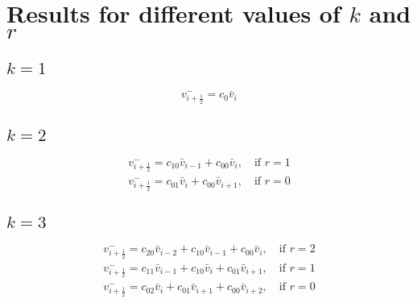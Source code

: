 \documentclass{article}
\begin{document}
\section*{Results for different values of $k$ and $r$}

\subsection*{$k=1$}
\begin{equation}
\begin{array}{l}
\displaystyle v_{i+\frac{1}{2}}^{-} = c_{0} \bar{v}_{i}
\end{array}
\end{equation}

\subsection*{$k=2$}
\begin{equation}
\begin{array}{l}
\displaystyle v_{i+\frac{1}{2}}^{-} = c_{10} \bar{v}_{i-1} + c_{00} \bar{v}_{i}, \quad \text{if } r = 1 \\
\displaystyle v_{i+\frac{1}{2}}^{-} = c_{01} \bar{v}_{i} + c_{00} \bar{v}_{i+1}, \quad \text{if } r = 0
\end{array}
\end{equation}

\subsection*{$k=3$}
\begin{equation}
\begin{array}{l}
\displaystyle v_{i+\frac{1}{2}}^{-} = c_{20} \bar{v}_{i-2} + c_{10} \bar{v}_{i-1} + c_{00} \bar{v}_{i}, \quad \text{if } r = 2 \\
\displaystyle v_{i+\frac{1}{2}}^{-} = c_{11} \bar{v}_{i-1} + c_{10} \bar{v}_{i} + c_{01} \bar{v}_{i+1}, \quad \text{if } r = 1 \\
\displaystyle v_{i+\frac{1}{2}}^{-} = c_{02} \bar{v}_{i} + c_{01} \bar{v}_{i+1} + c_{00} \bar{v}_{i+2}, \quad \text{if } r = 0
\end{array}
\end{equation}
\end{document}
